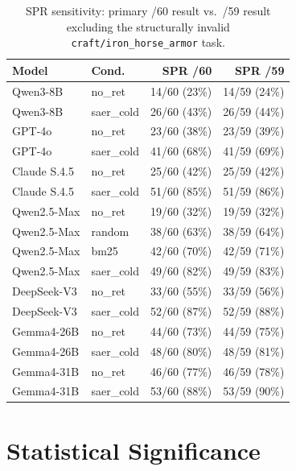 \documentclass[letterpaper]{article} %
\begin{document}
\begin{table}[tbp]
\centering
\caption{SPR sensitivity: primary /60 result vs.\ /59 result excluding
the structurally invalid \texttt{craft/iron\_horse\_armor} task.}
\label{tab:denom-sensitivity}
\small
\begin{tabular}{llrr}
\toprule
Model & Cond. & SPR /60 & SPR /59 \\
\midrule
Qwen3-8B      & no\_ret    & 14/60 (23\%) & 14/59 (24\%) \\
Qwen3-8B      & saer\_cold & 26/60 (43\%) & 26/59 (44\%) \\
GPT-4o        & no\_ret    & 23/60 (38\%) & 23/59 (39\%) \\
GPT-4o        & saer\_cold & 41/60 (68\%) & 41/59 (69\%) \\
Claude S.4.5  & no\_ret    & 25/60 (42\%) & 25/59 (42\%) \\
Claude S.4.5  & saer\_cold & 51/60 (85\%) & 51/59 (86\%) \\
Qwen2.5-Max   & no\_ret    & 19/60 (32\%) & 19/59 (32\%) \\
Qwen2.5-Max   & random     & 38/60 (63\%) & 38/59 (64\%) \\
Qwen2.5-Max   & bm25       & 42/60 (70\%) & 42/59 (71\%) \\
Qwen2.5-Max   & saer\_cold & 49/60 (82\%) & 49/59 (83\%) \\
DeepSeek-V3   & no\_ret    & 33/60 (55\%) & 33/59 (56\%) \\
DeepSeek-V3   & saer\_cold & 52/60 (87\%) & 52/59 (88\%) \\
Gemma4-26B    & no\_ret    & 44/60 (73\%) & 44/59 (75\%) \\
Gemma4-26B    & saer\_cold & 48/60 (80\%) & 48/59 (81\%) \\
Gemma4-31B    & no\_ret    & 46/60 (77\%) & 46/59 (78\%) \\
Gemma4-31B    & saer\_cold & 53/60 (88\%) & 53/59 (90\%) \\
\bottomrule
\end{tabular}
\end{table}

\section{Statistical Significance}
\label{sec:stats}
\end{document}
